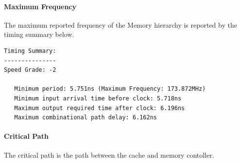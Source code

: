 \documentclass[11pt,letterpaper,]{article}
\begin{document}
\paragraph{ Maximum Frequency }
The maximum reported frequency of the Memory hierarchy is reported by the timing summary below.

\begin{verbatim}
Timing Summary:
---------------
Speed Grade: -2

   Minimum period: 5.751ns (Maximum Frequency: 173.872MHz)
   Minimum input arrival time before clock: 5.718ns
   Maximum output required time after clock: 6.196ns
   Maximum combinational path delay: 6.162ns
\end{verbatim}

\paragraph{ Critical Path }
The critical path is the path between the cache and memory contoller.
\end{document}
